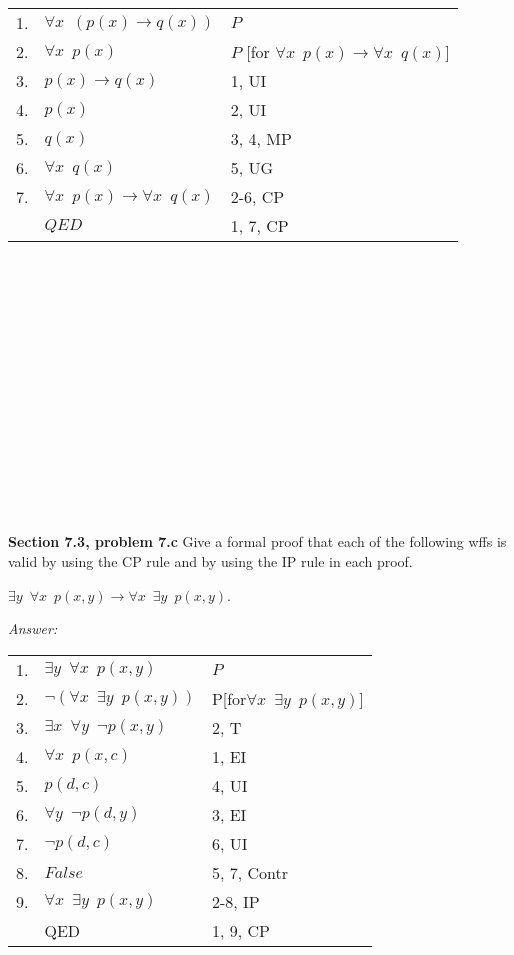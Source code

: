 \documentclass[12pt]{article}
\begin{document}
\begin{tabular}{p{.8cm}p{8.5cm}l}
1. & $\forall x \enspace (p(x) \rightarrow q(x))$ & $P$ \\
2. & \qquad $\forall x \enspace p(x)$ & $P$ [for $\forall x 
             \enspace p(x) \rightarrow \forall x \enspace q(x)$] \\
3. & \qquad $p(x) \rightarrow q(x)$ & 1, UI \\
4. & \qquad $p(x)$ & 2, UI \\
5. & \qquad  $q(x)$ & 3, 4, MP \\
6. & \qquad $\forall x \enspace q(x)$ & 5, UG \\
7. & $\forall x \enspace p(x) \rightarrow \forall x \enspace q(x)$ & 2-6, CP \\
& $QED$ & 1, 7, CP \\
\end{tabular}
\\
\\
\\
\\
\\
\\
\\
\\
\\
\\
\\
\\
\\
\\
\textbf{Section 7.3, problem 7.c}  Give a formal proof that each of the following 
wffs is valid by using the CP rule and by using the IP rule in each proof.

$\exists y \enspace \forall x \enspace p(x, y) \rightarrow 
\forall x \enspace \exists y \enspace p(x, y)$.

\emph{Answer:} 

\begin{tabular}{p{.8cm}p{8.5cm}l}
1. & $\exists y \enspace \forall x \enspace p(x, y)$ & $P$ \\
2. & \qquad $\neg (\forall x \enspace \exists y  \enspace p(x,y))$ 
                             & P[for$\forall x \enspace \exists y \enspace p(x, y)$] \\
3. & \qquad $\exists x \enspace \forall y  \enspace \neg p(x,y)$  & 2, T \\                           
4. & \qquad $\forall x \enspace p(x, c)$ & 1, EI \\
5. & \qquad $p(d,c)$ & 4, UI \\
6. & \qquad $\forall y \enspace \neg p(d,y)$ & 3, EI\\
7. & \qquad $\neg p(d,c)$ & 6, UI \\
8. & \qquad $False$ & 5, 7, Contr \\
9. & $\forall x \enspace \exists y \enspace p(x, y)$ & 2-8, IP \\
& QED & 1, 9, CP \\
\end{tabular}
\end{document}
